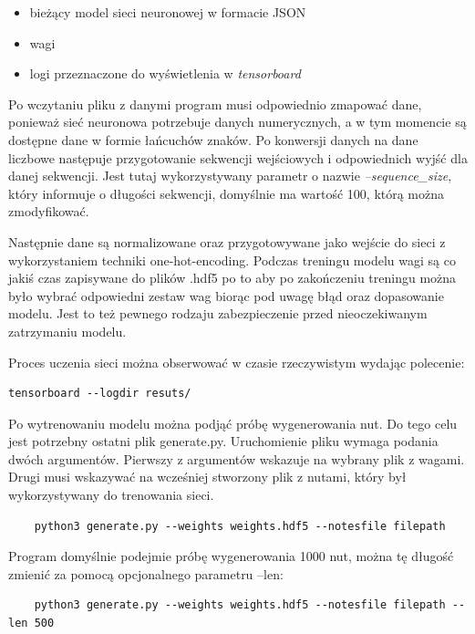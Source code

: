 	\begin{itemize}
		\item bieżący model sieci neuronowej w formacie JSON
		\item wagi 
		\item logi przeznaczone do wyświetlenia w \textit{tensorboard}
	\end{itemize}
		
	Po wczytaniu pliku z danymi program musi odpowiednio zmapować dane, ponieważ sieć neuronowa potrzebuje danych numerycznych, a w tym momencie są dostępne dane w formie łańcuchów znaków. Po konwersji danych na dane liczbowe następuje przygotowanie sekwencji wejściowych i odpowiednich wyjść dla danej sekwencji. Jest tutaj wykorzystywany parametr o nazwie \textit{--sequence\_size}, który informuje o długości sekwencji, domyślnie ma wartość 100, którą można zmodyfikować.
		
	Następnie dane są normalizowane oraz przygotowywane jako wejście do sieci z wykorzystaniem techniki one-hot-encoding. Podczas treningu modelu wagi są co jakiś czas zapisywane do plików .hdf5 po to aby po zakończeniu treningu można było wybrać odpowiedni zestaw wag biorąc pod uwagę błąd oraz dopasowanie modelu. Jest to też pewnego rodzaju zabezpieczenie przed nieoczekiwanym zatrzymaniu modelu. 
	
	Proces uczenia sieci można obserwować w czasie rzeczywistym wydając polecenie:
	
	\begin{lstlisting}[caption={Wykorzystanie tensorboard do wizualizacji wyników},captionpos=b]
		tensorboard --logdir resuts/
	\end{lstlisting}
	
	Po wytrenowaniu modelu można podjąć próbę wygenerowania nut. Do tego celu jest potrzebny ostatni plik generate.py. Uruchomienie pliku wymaga podania dwóch argumentów. Pierwszy z argumentów wskazuje na wybrany plik z wagami. Drugi musi wskazywać na wcześniej stworzony plik z nutami, który był wykorzystywany do trenowania sieci.
	
	\begin{lstlisting}
	python3 generate.py --weights weights.hdf5 --notesfile filepath
	\end{lstlisting}	
	
	Program domyślnie podejmie próbę wygenerowania 1000 nut, można tę długość zmienić za pomocą opcjonalnego parametru --len:
	
	\begin{lstlisting}
	python3 generate.py --weights weights.hdf5 --notesfile filepath --len 500
	\end{lstlisting}	
	
